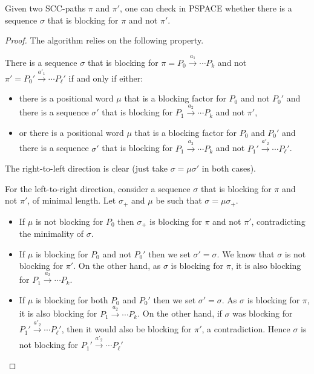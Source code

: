 \documentclass[letterpaper, USenglish, cleveref, autoref, thm-restate, numberwithinsect]{lipics-v2021}
\theoremstyle{theorem}
\theoremstyle{definition}
\newcommand{\PSPACE}{\textsf{PSPACE}\xspace}
\newcommand{\SCCpath}{\pi}
\begin{document}
\begin{lemma}
	\label{lem:PSPACE-blocking-for-one}
	Given two SCC-paths $\SCCpath$ and $\SCCpath'$, one can check in \PSPACE whether there is a sequence $\sigma$ that is blocking for $\SCCpath$ and not $\SCCpath'$.
\end{lemma}
\begin{proof}
	The algorithm relies on the following property.
	\begin{claim}
		There is a sequence $\sigma$ that is blocking for $\SCCpath = P_0 \xrightarrow{a_1} \cdots  P_k$ and not $\SCCpath' = P_0' \xrightarrow{a'_1} \cdots  P_\ell'$ if and only if either:
		\begin{itemize}
			\item there is a positional word $\mu$ that is a blocking factor for $P_0$ and not $P_0'$ and there is a sequence $\sigma'$ that is blocking for $P_1 \xrightarrow{a_2} \cdots  P_k$ and not $\SCCpath'$,
			
			\item or there is a positional word $\mu$ that is a blocking factor for $P_0$ and $P_0'$ and there is a sequence $\sigma'$ that is blocking for $P_1 \xrightarrow{a_2} \cdots  P_k$ and not $P_1' \xrightarrow{a'_2} \cdots  P_\ell'$.
		\end{itemize}
	\end{claim}
	\begin{claimproof}
		The right-to-left direction is clear (just take $\sigma =  \mu \sigma'$ in both cases).
		
		For the left-to-right direction, consider a sequence $\sigma$ that is blocking for $\SCCpath$ and not $\SCCpath'$, of minimal length.
		Let $\sigma_+$ and $\mu$ be such that $\sigma = \mu \sigma_+$.
		\begin{itemize}
			\item If $\mu$ is not blocking for $P_0$ then $\sigma_+$ is blocking for $\SCCpath$ and not $\SCCpath'$, contradicting the minimality of $\sigma$.
			
			\item If $\mu$ is blocking for $P_0$ and not $P_0'$ then we set $\sigma' = \sigma$. We know that $\sigma$ is not blocking for $\SCCpath'$. On the other hand, as $\sigma$ is blocking for $\SCCpath$, it is also blocking for $P_1 \xrightarrow{a_2} \cdots  P_k$.
			
			\item If $\mu$ is blocking for both $P_0$ and  $P_0'$ then we set $\sigma' = \sigma$. 
			As $\sigma$ is blocking for $\SCCpath$, it is also blocking for $P_1 \xrightarrow{a_2} \cdots  P_k$. 
			On the other hand, if $\sigma$ was blocking for $P_1' \xrightarrow{a'_2} \cdots  P_\ell'$, then it would also be blocking for $\SCCpath'$, a contradiction. Hence $\sigma$ is not blocking for $P_1' \xrightarrow{a'_2} \cdots  P_\ell'$
		\end{itemize}
	\end{claimproof}
	

\end{proof}
\end{document}
